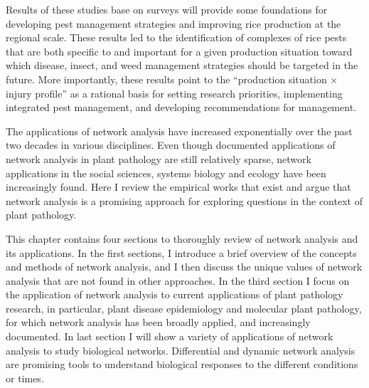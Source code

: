 Results of these studies base on surveys will provide some foundations for developing pest management strategies and improving rice production at the regional scale. These results led to the identification of complexes of rice pests that are both specific to and important for a given production situation toward which disease, insect, and weed management strategies should be targeted in the future. More importantly, these results point to the “production situation × injury profile” as a rational basis for setting research priorities, implementing integrated pest management, and developing recommendations for management.


The applications of network analysis have increased exponentially over the past two decades in various disciplines. Even though documented applications of network analysis in plant pathology are still relatively sparse, network applications in the social sciences, systems biology and ecology have been increasingly found. Here I review the empirical works that exist and argue that network analysis is a promising approach for exploring questions in the context of plant pathology.


This chapter contains four sections to thoroughly review of network analysis and its applications. In the first sections, I introduce a brief overview of the concepts and methods of network analysis, and I then discuss the unique values of network analysis that are not found in other approaches. In the third section I focus on the application of network analysis to current applications of plant pathology research, in particular, plant disease epidemiology and molecular plant pathology, for which network analysis has been broadly applied, and increasingly documented. In last section I will show a variety of applications of network analysis to study biological networks. Differential and dynamic network analysis are promising tools to understand biological responses to the different conditions or times.



